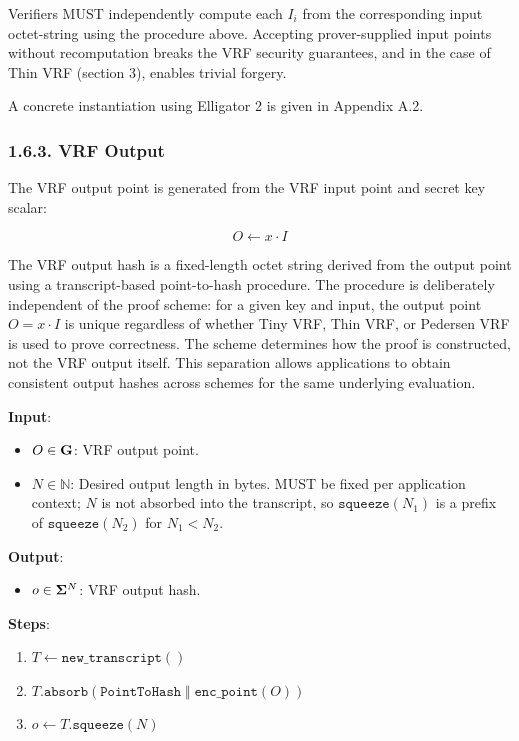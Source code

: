 \documentclass[
]{article}
\providecommand{\tightlist}{%
  \setlength{\itemsep}{0pt}\setlength{\parskip}{0pt}}
\begin{document}
Verifiers MUST independently compute each \(I_i\) from the corresponding
input octet-string using the procedure above. Accepting prover-supplied
input points without recomputation breaks the VRF security guarantees,
and in the case of Thin VRF (section 3), enables trivial forgery.

A concrete instantiation using Elligator 2 is given in Appendix A.2.

\subsubsection{1.6.3. VRF Output}\label{vrf-output}

The VRF output point is generated from the VRF input point and secret
key scalar:

\[O \gets x \cdot I\]

The VRF output hash is a fixed-length octet string derived from the
output point using a transcript-based point-to-hash procedure. The
procedure is deliberately independent of the proof scheme: for a given
key and input, the output point \(O = x \cdot I\) is unique regardless
of whether Tiny VRF, Thin VRF, or Pedersen VRF is used to prove
correctness. The scheme determines how the proof is constructed, not the
VRF output itself. This separation allows applications to obtain
consistent output hashes across schemes for the same underlying
evaluation.

\textbf{Input}:

\begin{itemize}
\tightlist
\item
  \(O \in \bold{G}\): VRF output point.
\item
  \(N \in \mathbb{N}\): Desired output length in bytes. MUST be fixed
  per application context; \(N\) is not absorbed into the transcript, so
  \(\texttt{squeeze}(N_1)\) is a prefix of \(\texttt{squeeze}(N_2)\) for
  \(N_1 < N_2\).
\end{itemize}

\textbf{Output}:

\begin{itemize}
\tightlist
\item
  \(o \in \bold{\Sigma}^N\): VRF output hash.
\end{itemize}

\textbf{Steps}:

\begin{enumerate}
\def\labelenumi{\arabic{enumi}.}
\tightlist
\item
  \(T \gets \texttt{new\_transcript}()\)
\item
  \(T.\texttt{absorb}(\texttt{PointToHash} \;\Vert\; \texttt{enc\_point}(O))\)
\item
  \(o \gets T.\texttt{squeeze}(N)\)
\end{enumerate}
\end{document}
